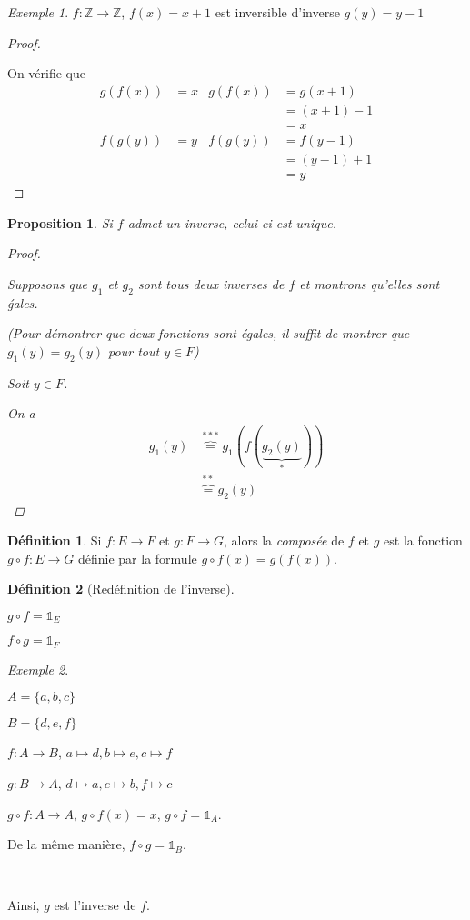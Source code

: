 \documentclass{report}
\newcommand*{\entiers}{\mathbb{Z}}
\newcommand*{\identite}{\mathds{1}}
\newtheorem*{prop}{Proposition}
\theoremstyle{definition}
\newtheorem*{defin}{D\'efinition}
\theoremstyle{remark}
\newtheorem*{exem}{Exemple}
\begin{document}
	\begin{exem}
		$f:\entiers \to \entiers$, $f(x)=x+1$ est inversible d'inverse $g(y)=y-1$

		\begin{proof}
			~

			On v\'erifie que
			\begin{align*}
				g(f(x))&= x& g(f(x))&= g(x+1)\\
				&&&= (x+1)-1\\
				&&&= x\\
				f(g(y))&= y& f(g(y))&= f(y-1)\\
				&&&= (y-1)+1\\
				&&&= y
			\end{align*}
		\end{proof}
	\end{exem}

	\begin{prop}
		Si $f$ admet un inverse, celui-ci est unique.

		\begin{proof}
			~

			Supposons que $g_1$ et $g_2$ sont tous deux inverses de $f$ et montrons qu'elles sont \'gales.

			(Pour d\'emontrer que deux fonctions sont \'egales, il suffit de montrer que $g_1(y)=g_2(y)$ pour tout $y \in F$)

			Soit $y \in F$.

			On a
			\begin{align*}
				g_1(y)&\overbrace{=}^{***} g_1(f(\underbrace{g_2(y)}_{*}))\\
				&\overbrace{=}^{**} g_2(y)
			\end{align*}
		\end{proof}
	\end{prop}

	\begin{defin}
		Si $f:E \to F$ et $g:F \to G$, alors la \emph{compos\'ee} de $f$ et $g$ est la fonction $g \circ f:E \to G$ d\'efinie par la formule $g \circ f(x)=g(f(x))$.
	\end{defin}

	\begin{defin}[Red\'efinition de l'inverse]~

		$g \circ f=\identite_E$

		$f \circ g=\identite_F$
	\end{defin}

	\begin{exem}~

		$A=\{a,b,c\}$

		$B=\{d,e,f\}$

		$f:A \to B$, $a \mapsto d, b \mapsto e, c \mapsto f$

		$g:B \to A$, $d \mapsto a, e \mapsto b, f \mapsto c$

		$g \circ f:A \to A$, $g \circ f(x)=x$, $g \circ f=\identite_A$.

		De la m\^eme mani\`ere, $f \circ g=\identite_B$.

		~

		Ainsi, $g$ est l'inverse de $f$.
	\end{exem}
\end{document}
